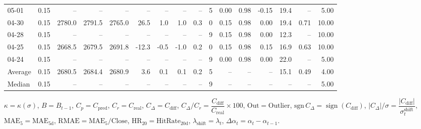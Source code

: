 \begin{threeparttable}
{\begin{tabular}{lrrrrrrrrrrrrrrr}
  05-01 &     0.15 &     -- &     -- &     -- &         -- &             -- &                       -- &                  -- &              5 &       0.00 &      0.98 &          -0.15 &             19.4 &              -- &                   5.00 \\
  04-30 &     0.15 & 2780.0 & 2791.5 & 2765.0 &       26.5 &            1.0 &                      1.0 &                 0.3 &              0 &       0.15 &      0.98 &           0.00 &             19.4 &            0.71 &                  10.00 \\
  04-28 &     0.15 &     -- &     -- &     -- &         -- &             -- &                       -- &                  -- &              9 &       0.15 &      0.98 &           0.00 &             12.3 &              -- &                  10.00 \\
  04-25 &     0.15 & 2668.5 & 2679.5 & 2691.8 &      -12.3 &           -0.5 &                     -1.0 &                 0.2 &              0 &       0.15 &      0.98 &           0.15 &             16.9 &            0.63 &                  10.00 \\
  04-24 &     0.15 &     -- &     -- &     -- &         -- &             -- &                       -- &                  -- &              9 &       0.00 &      0.98 &           0.00 &             22.0 &              -- &                   5.00 \\
Average &     0.15 & 2680.5 & 2684.4 & 2680.9 &        3.6 &            0.1 &                      0.1 &                 0.2 &              5 &         -- &        -- &             -- &             15.1 &            0.49 &                   4.00 \\
 Median &     0.15 &     -- &     -- &     -- &         -- &             -- &                       -- &                  -- &              9 &         -- &        -- &             -- &               -- &              -- &                   5.00 \\
\bottomrule
\end{tabular}
}
\begin{tablenotes}\footnotesize
\item $\kappa=\kappa(\sigma)$, $B=B_{t-1}$, $C_p=C_{\text{pred}}$, $C_r=C_{\text{real}}$, $C_\Delta=C_{\text{diff}}$, $C_\Delta/C_r=\dfrac{C_{\text{diff}}}{C_{\text{real}}}\times100$, $\mathrm{Out}=\text{Outlier}$, $\mathrm{sgn}\,C_\Delta=\operatorname{sign}(C_{\text{diff}})$, $|C_\Delta|/\sigma=\dfrac{|C_{\text{diff}}|}{\sigma_t^{\text{shift}}}$, $\mathrm{MAE}_5=\mathrm{MAE}_{5\text{d}}$, $\mathrm{RMAE}= \mathrm{MAE}_5 / \text{Close}$, $\mathrm{HR}_{20}=\mathrm{HitRate}_{20\text{d}}$, 
$\lambda_{\text{shift}}=\lambda_t$, 
$\Delta\alpha_t=\alpha_t-\alpha_{t-1}$.
\end{tablenotes}
\end{threeparttable}
\endgroup

